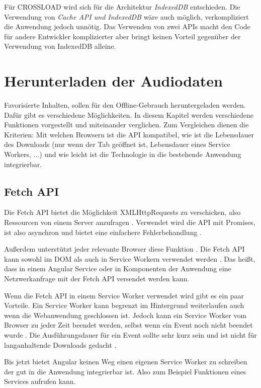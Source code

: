 Für CROSSLOAD wird sich für die Architektur \textit{IndexedDB} entschieden. Die Verwendung von \textit{Cache API und IndexedDB} wäre auch möglich, verkompliziert die Anwendung jedoch unnötig. Das Verwenden von zwei \acp{API} macht den Code für andere Entwickler komplizierter aber bringt keinen Vorteil gegenüber der Verwendung von IndexedDB alleine.

\section{Herunterladen der Audiodaten}
Favorisierte Inhalten, sollen für den Offline-Gebrauch heruntergeladen werden. Dafür gibt es verschiedene Möglichkeiten. In diesem Kapitel werden verschiedene Funktionen vorgestellt und miteinander verglichen. Zum Vergleichen dienen die Kriterien: Mit welchen Browsern ist die \ac{API} kompatibel, wie ist die Lebensdauer des Downloads (nur wenn der Tab geöffnet ist, Lebensdauer eines Service Workers, ...) und wie leicht ist die Technologie in die bestehende Anwendung integrierbar.

\subsection{Fetch API}
Die Fetch \ac{API} bietet die Möglichkeit XMLHttpRequests zu verschicken, also Ressourcen von einem Server anzufragen \autocite{Rojas2020}. Verwendet wird die \ac{API} mit Promises, ist also asynchron und bietet eine einfachere Fehlerbehandlung \autocite{Rojas2020} \autocite{mdn-fetch}. 

Außerdem unterstützt jeder relevante Browser diese Funktion \autocite{mdn-fetch}. Die Fetch \ac{API} kann sowohl im \ac{DOM} als auch in Service Workern verwendet werden \autocite{mdn-fetch}. Das heißt, dass in einem Angular Service oder in Komponenten der Anwendung eine Netzwerkanfrage mit der Fetch \ac{API} versendet werden kann.

Wenn die Fetch \ac{API} in einem Service Worker verwendet wird gibt es ein paar Vorteile. Ein Service Worker kann begrenzt im Hintergrund weiterlaufen auch wenn die Webanwendung geschlossen ist. Jedoch kann ein Service Worker vom Browser zu jeder Zeit beendet werden, selbst wenn ein Event noch nicht beendet wurde \autocite{service-worker-spec}. Die Ausführungsdauer für ein Event sollte sehr kurz sein und ist nicht für langanhaltende Downloads gedacht \autocite{service-worker-spec}.

Bis jetzt bietet Angular keinen Weg einen eigenen Service Worker zu schreiben der gut in die Anwendung integrierbar ist. Also zum Beispiel Funktionen eines Services aufrufen kann. 

